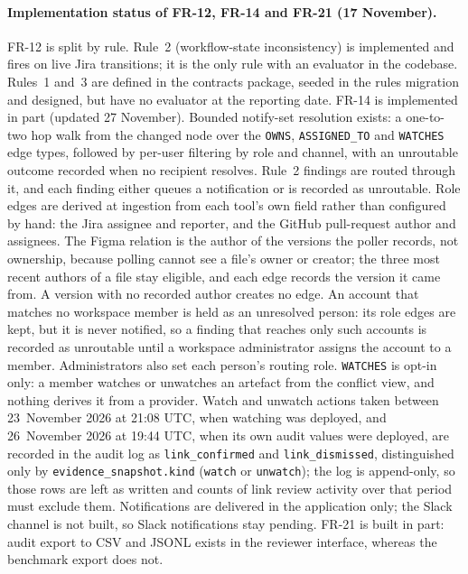 \paragraph{Implementation status of FR-12, FR-14 and FR-21 (17 November).}
FR-12 is split by rule. Rule~2 (workflow-state inconsistency) is implemented and
fires on live Jira transitions; it is the only rule with an evaluator in the
codebase. Rules~1 and~3 are defined in the contracts package, seeded in the
rules migration and designed, but have no evaluator at the reporting date.
FR-14 is implemented in part (updated 27 November). Bounded notify-set
resolution exists: a one-to-two hop walk from the changed node over the
\texttt{OWNS}, \texttt{ASSIGNED\_TO} and \texttt{WATCHES} edge types, followed by
per-user filtering by role and channel, with an unroutable outcome recorded
when no recipient resolves. Rule~2 findings are routed through it, and each
finding either queues a notification or is recorded as unroutable. Role
edges are derived at ingestion from each tool's own field rather than
configured by hand: the Jira assignee and reporter, and the GitHub pull-request
author and assignees. The Figma relation is the author of the versions the
poller records, not ownership, because polling cannot see a file's owner or
creator; the three most recent authors of a file stay eligible, and each edge
records the version it came from. A version with no recorded author creates no
edge. An account that matches no workspace member is held as an unresolved
person: its role edges are kept, but it is never notified, so a finding that
reaches only such accounts is recorded as unroutable until a workspace
administrator assigns the account to a member. Administrators also set each
person's routing role. \texttt{WATCHES} is opt-in only: a member watches or
unwatches an artefact from the conflict view, and nothing derives it from a
provider. Watch and unwatch actions taken between 23~November 2026 at 21:08
UTC, when watching was deployed, and 26~November 2026 at 19:44 UTC, when its own
audit values were deployed, are recorded in the audit log as
\texttt{link\_confirmed} and \texttt{link\_dismissed}, distinguished only by
\texttt{evidence\_snapshot.kind} (\texttt{watch} or \texttt{unwatch}); the log
is append-only, so those rows are left as written and counts of link review
activity over that period must exclude them. Notifications are delivered in the
application only; the Slack channel is not built, so Slack notifications stay
pending. FR-21 is built in
part: audit export to CSV and JSONL exists in the reviewer interface, whereas
the benchmark export does not.

